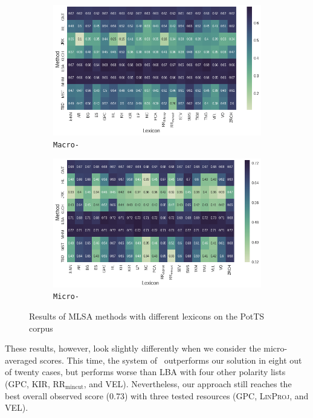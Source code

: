 \begin{figure}
{
\centering
\begin{subfigure}{.5\textwidth}
  \centering
  \includegraphics[width=\linewidth]{img/cgsa_potts_macro_lexicons.png}
  \caption{\texttt{Macro-\F{}}}\label{cgsa:fig:potts-lexicon-macro}
\end{subfigure}%
\begin{subfigure}{.5\textwidth}
  \centering
  \includegraphics[width=\linewidth]{img/cgsa_potts_micro_lexicons.png}
  \caption{\texttt{Micro-\F{}}}\label{cgsa:fig:potts-lexicon-micro}
\end{subfigure}
}
\caption[MLSA results on PotTS with different lexicons]{Results of
  MLSA methods with different lexicons on the PotTS
  corpus}\label{cgsa:fig:potts-lexicon-effect}
\end{figure}

These results, however, look slightly differently when we consider the
micro-averaged scores. This time, the system
of~\citeauthor{Mohammad:13} outperforms our solution in eight out of
twenty cases, but performs worse than LBA with four other polarity
lists (GPC, KIR, RR$_{\textrm{mincut}}$, and VEL).  Nevertheless, our
approach still reaches the best overall observed score (0.73) with
three tested resources (GPC, \textsc{LinProj}, and VEL).

